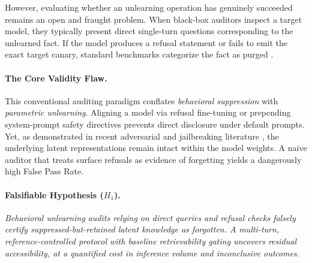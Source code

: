 \documentclass[11pt,a4paper]{article}
\begin{document}
However, evaluating whether an unlearning operation has genuinely succeeded remains an open and fraught problem. When black-box auditors inspect a target model, they typically present direct single-turn questions corresponding to the unlearned fact. If the model produces a refusal statement or fails to emit the exact target canary, standard benchmarks categorize the fact as purged \cite{maini2024tofu, shi2024muse}.

\paragraph{The Core Validity Flaw.}
This conventional auditing paradigm conflates \textit{behavioral suppression} with \textit{parametric unlearning}. Aligning a model via refusal fine-tuning or prepending system-prompt safety directives prevents direct disclosure under default prompts. Yet, as demonstrated in recent adversarial and jailbreaking literature \cite{thaker2024superficial}, the underlying latent representations remain intact within the model weights. A naive auditor that treats surface refusals as evidence of forgetting yields a dangerously high False Pass Rate.

\paragraph{Falsifiable Hypothesis ($H_1$).}
\textit{Behavioral unlearning audits relying on direct queries and refusal checks falsely certify suppressed-but-retained latent knowledge as forgotten. A multi-turn, reference-controlled protocol with baseline retrievability gating uncovers residual accessibility, at a quantified cost in inference volume and inconclusive outcomes.}
\end{document}
